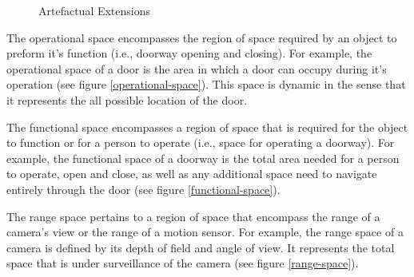 \documentclass[12pt]{ucthesis}
\begin{document}
\begin{figure}[H]
 \centering
 \hspace{9 mm}
  \hspace{9 mm}
 \caption{Artefactual Extensions}
\label{artefactual-extensions}
\end{figure}

The operational space encompasses the region of space required by an object to preform it's function (i.e., doorway opening and closing). For example, the operational space of a door is the area in which a door can occupy during it's operation (see figure \ref{operational-space}). This space is dynamic in the sense that it represents the all possible location of the door. 

The functional space encompasses a region of space that is required for the object to function or for a person to operate (i.e., space for operating a doorway). For example, the functional space of a doorway is the total area needed for a person to operate, open and close, as well as any additional space need to navigate entirely through the door (see figure \ref{functional-space}). 

The range space pertains to a region of space that encompass the range of a camera's view or the range of a motion sensor. For example, the range space of a camera is defined by its depth of field and angle of view. It represents the total space that is under surveillance of the camera (see figure \ref{range-space}).
\end{document}

